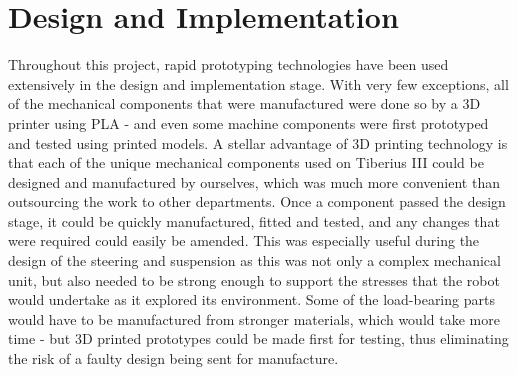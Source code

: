 \section{Design and Implementation}
Throughout this project, rapid prototyping technologies have been used extensively in the design and implementation stage. With very few exceptions, all of the mechanical components that were manufactured were done so by a 3D printer using \gls{PLA} - and even some machine components were first prototyped and tested using printed models.
\newline
A stellar advantage of 3D printing technology is that each of the unique mechanical components used on Tiberius III could be designed and manufactured by ourselves, which was much more convenient than outsourcing the work to other departments. Once a component passed the design stage, it could be quickly manufactured, fitted and tested, and any changes that were required could easily be amended. This was especially useful during the design of the steering and suspension as this was not only a complex mechanical unit, but also needed to be strong enough to support the stresses that the robot would undertake as it explored its environment. Some of the load-bearing parts would have to be manufactured from stronger materials, which would take more time - but 3D printed prototypes could be made first for testing, thus eliminating the risk of a faulty design being sent for manufacture.
